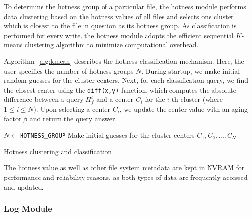 To determine the hotness group of a particular file, the hotness module 
performs data clustering based on the hotness values of all files and selects
one cluster which is closest to the file in question as its hotness group. As
classification is performed for every write, the hotness module adopts the
efficient sequential $K$-means clustering algorithm \cite{macqueen67} to
minimize computational overhead.

Algorithm~\ref{alg:kmean} describes the hotness classification mechanism.
Here, the user specifies the number of hotness groups $N$.  During startup, we
make initial random guesses for the cluster centers.  Next, for each
classification query, we find the closest center using the \texttt{diff(x,y)}
function, which computes the absolute difference between a query $H_{f}^{t}$
and a center $C_{i}$ for the $i$-th cluster (where $1\le i\le N$).  Upon
selecting a center $C_i$, we update the center value with an aging factor
$\beta$ and return the query answer.


\begin{algorithm}[t]
    \small
    \DontPrintSemicolon
    $N \gets $\verb|HOTNESS_GROUP|\;
    Make initial guesses for the cluster centers $C_{1}, C_{2},...,C_{N}$ \;
    \caption{Hotness clustering and classification}
    \label{alg:kmean}
\end{algorithm}

The hotness value as well as other file system metadata are kept in NVRAM for
performance and reliability reasons, as both types of data are frequently
accessed and updated.  

\subsubsection{Log Module} 

